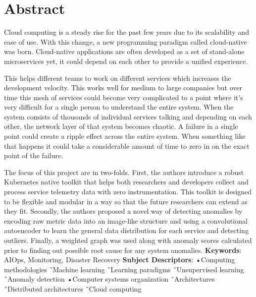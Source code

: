 \chapter*{Abstract}


Cloud computing is a steady rise for the past few years due to its scalability and ease of use. With this change, a new programming paradigm called cloud-native was born. Cloud-native applications are often developed as a set of stand-alone microservices yet, it could depend on each other to provide a unified experience. 

This helps different teams to work on different services which increases the development velocity. This works well for medium to large companies but over time this mesh of services could become very complicated to a point where it's very difficult for a single person to understand the entire system. When the system consists of thousands of individual services talking and depending on each other, the network layer of that system becomes chaotic. A failure in a single point could create a ripple effect across the entire system. When something like that happens it could take a considerable amount of time to zero in on the exact point of the failure.

The focus of this project are in two-folds. First, the authors introduce a robust Kubernetes native toolkit that helps both researchers and developers collect and process service telemetry data with zero instrumentation. This toolkit is designed to be flexible and modular in a way so that the future researchers can extend as they fit. Secondly, the authors proposed a novel way of detecting anomalies by encoding raw metric data into an image-like structure and using a convolutional autoencoder to learn the general data distribution for each service and detecting outliers. Finally, a weighted graph was used along with anomaly scores calculated prior to finding out possible root cause for any system anomalies.
\newline
\newline
\textbf{Keywords}:
AIOps, Monitoring, Disaster Recovery
\newline
\textbf{Subject Descriptors}:
•Computing methodologies \~\ Machine learning \~\ Learning paradigms \~\ Unsupervised learning \~\ Anomaly detection •Computer systems organization \~\ Architectures \~\ Distributed architectures \~\ Cloud computing